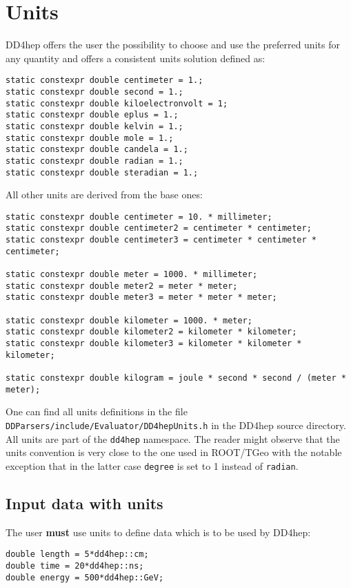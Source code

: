 \section{Units}
DD4hep offers the user the possibility to choose and use the preferred units for any quantity and offers a consistent units solution defined as:
\begin{verbatim}
static constexpr double centimeter = 1.;
static constexpr double second = 1.;
static constexpr double kiloelectronvolt = 1;
static constexpr double eplus = 1.;
static constexpr double kelvin = 1.;
static constexpr double mole = 1.;
static constexpr double candela = 1.;
static constexpr double radian = 1.;
static constexpr double steradian = 1.;
\end{verbatim}
All other units are derived from the base ones:
\begin{verbatim}
static constexpr double centimeter = 10. * millimeter;
static constexpr double centimeter2 = centimeter * centimeter;
static constexpr double centimeter3 = centimeter * centimeter * centimeter;

static constexpr double meter = 1000. * millimeter;
static constexpr double meter2 = meter * meter;
static constexpr double meter3 = meter * meter * meter;

static constexpr double kilometer = 1000. * meter;
static constexpr double kilometer2 = kilometer * kilometer;
static constexpr double kilometer3 = kilometer * kilometer * kilometer;

static constexpr double kilogram = joule * second * second / (meter * meter);
\end{verbatim}
One can find all units definitions in the file \texttt{DDParsers/include/Evaluator/DD4hepUnits.h} in the DD4hep source directory. All units are part of the \texttt{dd4hep} namespace. The reader might observe that the units convention is very close to the one used in ROOT/TGeo with the notable exception that in the latter case \texttt{degree} is set to 1 instead of \texttt{radian}.

\subsection{Input data with units}
The user \textbf{must} use units to define data which is to be used by DD4hep:
\begin{verbatim}
double length = 5*dd4hep::cm;
double time = 20*dd4hep::ns;
double energy = 500*dd4hep::GeV;
\end{verbatim}

